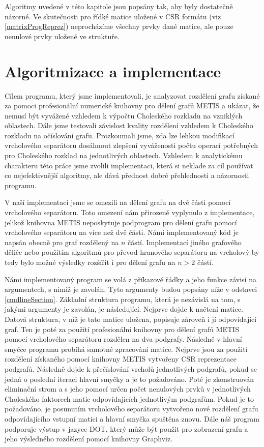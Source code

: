 \documentclass[11pt,american,czech,oneside]{book}
\theoremstyle{plain}
\theoremstyle{definition}
\begin{document}
Algoritmy uvedené v této kapitole jsou popsány tak, aby byly dostatečně názorné. Ve skutečnosti pro řídké matice uložené v CSR formátu (viz \ref{matrixProgReprez}) neprocházíme všechny prvky dané matice, ale pouze nenulové prvky uložené ve struktuře.


\chapter{Algoritmizace a implementace}

Cílem programu, který jsme implementovali, je analyzovat rozdělení grafu získané za pomoci profesionální numerické knihovny pro dělení grafů METIS a ukázat, že nemusí být vyvážené vzhledem k výpočtu Choleského rozkladu na vzniklých oblastech. Dále jsme testovali závislost kvality rozdělení vzhledem k Choleského rozkladu na očíslování grafu. Prozkoumali jsme, zda lze lehkou modifikací vrcholového separátoru dosáhnout zlepšení vyváženosti počtu operací potřebných pro Choleského rozklad na jednotlivých oblastech. Vzhledem k analytickému charakteru této práce jsme zvolili implementaci, která si neklade za cíl používat co nejefektivnější algoritmy, ale dává přednost dobré přehlednosti a názornosti programu.

V naší implementaci jsme se omezili na dělení grafu na dvě části pomocí vrcholového separátoru. Toto omezení nám přirozeně vyplynulo z implementace, jelikož knihovna METIS neposkytuje podprogram pro dělení grafu pomocí vrcholového separátoru na více než dvě části. Námi implementovaný kód je napsán obecně pro graf rozdělený na $n$ částí. Implementací jiného grafového děliče nebo použitím algoritmů pro převod hranového separátoru na vrcholový by tedy bylo možné výsledky rozšířit i pro dělení grafu na $n>2$ částí.

Námi implementovaný program se volá z příkazové řádky a jeho funkce závisí na argumentech, s nimiž je zavolán. Tyto argumenty budou popsány níže v odstavci \ref{cmdlineSection}. Základní struktura programu, která je nezávislá na tom, s jakými argumenty je zavolán, je následující. Nejprve dojde k načtení matice. Datová struktura, v níž je tato matice uložena, popisuje zároveň i jí odpovídající graf. Ten je poté za použití profesionální knihovny pro dělení grafů METIS pomocí vrcholového separátoru rozdělen na dva podgrafy. Následně v hlavní smyčce programu probíhá samotné zpracování matice. Nejprve jsou za použití rozdělení získaného pomocí knihovny METIS vytvořeny CSR reprezentace podgrafů. Následně dojde k přečíslování vrcholů jednotlivých podgrafů, pokud se jedná o poslední iteraci hlavní smyčky a je to požadováno. Poté je zkonstruován eliminační strom a s jeho pomocí určen počet nenulových prvků v jednotlivých Choleského faktorech matic odpovídajících jednotlivým podgrafům. Pokud je to požadováno, je posunutím vrcholového separátoru vytvořeno nové rozdělení grafu odpovídajícího vstupní matici a hlavní smyčka spuštěna znovu. Dále náš program podporuje výstup v jazyce DOT, který může být použit pro zobrazení grafu a jeho výsledného rozdělení pomocí knihovny Graphviz.
\end{document}

